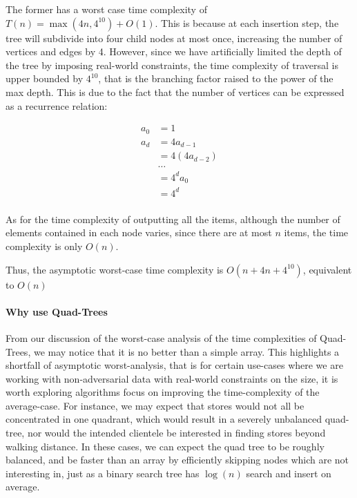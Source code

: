 \documentclass[12pt]{article}
\begin{document}
{The former has a worst case time complexity of $T(n) = \max(4n, 4^{10}) + O(1)$. This is because at each insertion step, the tree will subdivide into four child nodes at most once, increasing the number of vertices and edges by 4. However, since we have artificially limited the depth of the tree by imposing real-world constraints, the time complexity of traversal is upper bounded by $4^{10}$, that is the branching factor raised to the power of the max depth. This is due to the fact that the number of vertices can be expressed as a recurrence relation:

\begin{align*}
a_0 & = 1 \\
a_d & = 4a_{d-1}\\
    & = 4(4a_{d-2}) \\
    & \ldots \\
    & = 4^da_0 \\
    & = 4^d \\
\end{align*}

As for the time complexity of outputting all the items, although the number of elements contained in each node varies, since there are at most $n$ items, the time complexity is only $O(n)$.


Thus, the asymptotic worst-case time complexity is $O(n + 4n + 4^{10})$, equivalent to $O(n)$

\paragraph{Why use Quad-Trees}

From our discussion of the worst-case analysis of the time complexities of Quad-Trees, we may notice that it is no better than a simple array. This highlights a shortfall of asymptotic worst-analysis, that is for certain use-cases where we are working with non-adversarial data with real-world constraints on the size, it is worth exploring algorithms focus on improving the time-complexity of the average-case. For instance, we may expect that stores would not all be concentrated in one quadrant, which would result in a severely unbalanced quad-tree, nor would the intended clientele be interested in finding stores beyond walking distance. In these cases, we can expect the quad tree to be roughly balanced, and be faster than an array by efficiently skipping nodes which are not interesting in, just as a binary search tree has $\log(n)$ search and insert on average.


}
\end{document}
